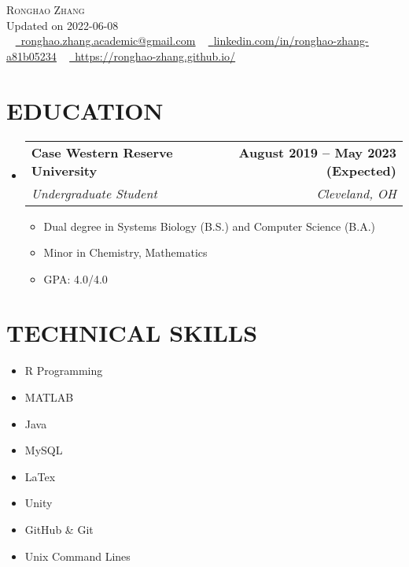 \documentclass[letterpaper,11pt]{article}
\makeatletter
\newcommand{\resumeItem}[1]{
	\item\small{
		{#1 \vspace{0pt}}
	}
}
\newcommand{\resumeSubheading}[4]{
	\vspace{-2pt}\item
	\begin{tabular*}{1.0\textwidth}[t]{l@{\extracolsep{\fill}}r}
		\textbf{#1} & \textbf{\small #2} \\
		\textit{\small#3} & \textit{\small #4} \\
	\end{tabular*}\vspace{-4pt}
}
\newcommand{\resumeSubHeadingListStart}{\begin{itemize}[leftmargin=0.0in, label={}]}
\newcommand{\resumeSubHeadingListEnd}{\end{itemize}}
\newcommand{\resumeItemListStart}{\begin{itemize}}
\newcommand{\resumeItemListEnd}{\end{itemize}\vspace{-5pt}}
\makeatother
\begin{document}
	
	\begin{center}
		{\Huge \scshape Ronghao Zhang} 
		\\ \vspace{5pt}
		Updated on 2022-06-08 
		\\ \vspace{5pt}
		\small \raisebox{-0.1\height} ~ 
		\href{mailto:x@gmail.com}{\raisebox{-0.2\height}\faEnvelope\          \underline{ronghao.zhang.academic@gmail.com}} ~ 
		\href{https://linkedin.com/in//}{\raisebox{-0.2\height}\faLinkedin\     \underline{linkedin.com/in/ronghao-zhang-a81b05234}}  ~
		\href{https://ronghao-zhang.github.io/}{\raisebox{-0.2\height}\faGithub\ \underline{https://ronghao-zhang.github.io/}}
		\vspace{1pt}
	\end{center}
	
	\section{EDUCATION}
	\resumeSubHeadingListStart
	\resumeSubheading
	{Case Western Reserve University}{August 2019 -- May 2023 (Expected)}
	{Undergraduate Student}{Cleveland, OH}
	\resumeItemListStart
	\resumeItem{Dual degree in Systems Biology (B.S.) and Computer Science (B.A.)}
	\resumeItem{Minor in Chemistry, Mathematics}
	\resumeItem{GPA: 4.0/4.0}
	\resumeItemListEnd
	\resumeSubHeadingListEnd
	
	\section{TECHNICAL SKILLS}
	\begin{multicols}{4}
		\begin{itemize}[itemsep=-2pt, parsep=5pt]
			\item\small R Programming
			\item       MATLAB 
			\item       Java
			\item       MySQL
			\item       LaTex
			\item       Unity
			\item       GitHub \& Git 
			\item       Unix Command Lines
			
		\end{itemize}
	\end{multicols}
	\vspace*{2.0\multicolsep}
	\vspace{7pt}
	
\end{document}
